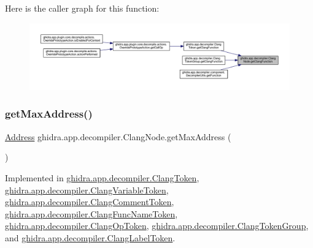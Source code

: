 Here is the caller graph for this function\+:
\nopagebreak
\begin{figure}[H]
\begin{center}
\leavevmode
\includegraphics[width=350pt]{interfaceghidra_1_1app_1_1decompiler_1_1_clang_node_a715989d3fa33942a85517fae04a70ac0_icgraph}
\end{center}
\end{figure}
\mbox{\label{interfaceghidra_1_1app_1_1decompiler_1_1_clang_node_a91e8beccce17b875e07d7c0747b43a97}} 
\subsubsection{\texorpdfstring{getMaxAddress()}{getMaxAddress()}}
{\footnotesize\ttfamily \mbox{\hyperlink{class_address}{Address}} ghidra.\+app.\+decompiler.\+Clang\+Node.\+get\+Max\+Address (\begin{DoxyParamCaption}{ }\end{DoxyParamCaption})}



Implemented in \mbox{\hyperlink{classghidra_1_1app_1_1decompiler_1_1_clang_token_aba3444e5da7a465cb090f4a7f15d8889}{ghidra.\+app.\+decompiler.\+Clang\+Token}}, \mbox{\hyperlink{classghidra_1_1app_1_1decompiler_1_1_clang_variable_token_a4a0d312a05e4e104f00e0433da2e1134}{ghidra.\+app.\+decompiler.\+Clang\+Variable\+Token}}, \mbox{\hyperlink{classghidra_1_1app_1_1decompiler_1_1_clang_comment_token_a53786dc2d9ec711ddb5c3c4864a651be}{ghidra.\+app.\+decompiler.\+Clang\+Comment\+Token}}, \mbox{\hyperlink{classghidra_1_1app_1_1decompiler_1_1_clang_func_name_token_a9678bd16bf55a5da6fd12eb93488c84e}{ghidra.\+app.\+decompiler.\+Clang\+Func\+Name\+Token}}, \mbox{\hyperlink{classghidra_1_1app_1_1decompiler_1_1_clang_op_token_a843c0db9334c599560d97afaecbf62e1}{ghidra.\+app.\+decompiler.\+Clang\+Op\+Token}}, \mbox{\hyperlink{classghidra_1_1app_1_1decompiler_1_1_clang_token_group_ab5ef3f19b60d99c92f3afed8c5ae411d}{ghidra.\+app.\+decompiler.\+Clang\+Token\+Group}}, and \mbox{\hyperlink{classghidra_1_1app_1_1decompiler_1_1_clang_label_token_a95af920ece03bd91e20d1dd7e7012512}{ghidra.\+app.\+decompiler.\+Clang\+Label\+Token}}.

